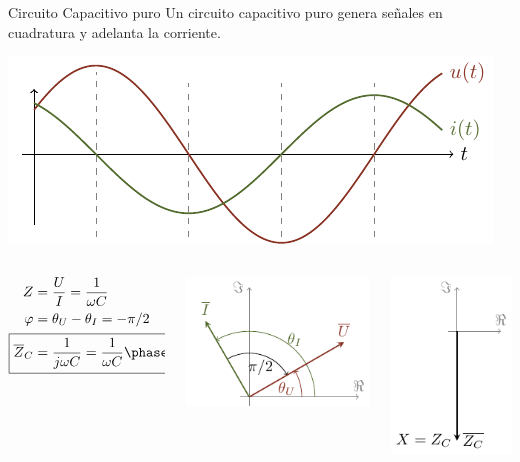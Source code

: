 \documentclass[aspectratio=169, usenames,svgnames,dvipsnames]{beamer}
\begin{document}
\begin{frame}[label={sec:org8e046af}]{Circuito Capacitivo puro}
Un circuito capacitivo puro genera \alert{señales en cuadratura} y \alert{adelanta la corriente}.

\begin{center}
\includegraphics[height=0.3\textheight]{../figs/capacitivoPuro.pdf}
\end{center}
\begin{columns}
\begin{column}{0.3\columnwidth}
\begin{align*}
  Z &= \dfrac{U}{I} = \dfrac{1}{\omega C}\\
  \varphi &= \theta_U - \theta_I = - \pi/2\\
  \Aboxed{\overline{Z}_C &= \dfrac{1}{j\omega C} = \dfrac{1}{\omega C}\phase{\ang{-90}}}
\end{align*}
\end{column}
\begin{column}{0.4\columnwidth}
\begin{center}
\includegraphics[height=0.4\textheight]{../figs/fasorCondensador_VI.pdf}
\end{center}
\end{column}
\begin{column}{0.3\columnwidth}
\begin{center}
\includegraphics[height=0.4\textheight]{../figs/fasorCondensador.pdf}
\end{center}
\end{column}
\end{columns}
\end{frame}
\end{document}
